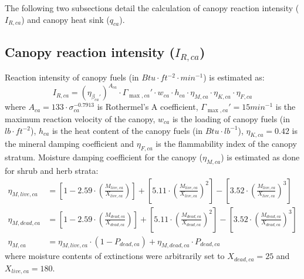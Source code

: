 \documentclass[]{book}
\begin{document}
The following two subsections detail the calculation of canopy reaction intensity (\(I_{R, ca}\)) and canopy heat sink (\(q_{ca}\)).

\hypertarget{canopy-reaction-intensity-i_r-ca}{%
\subsection{\texorpdfstring{Canopy reaction intensity (\(I_{R, ca}\))}{Canopy reaction intensity (I\_\{R, ca\})}}\label{canopy-reaction-intensity-i_r-ca}}

Reaction intensity of canopy fuels (in \(Btu \cdot ft^{-2} \cdot min^{-1}\)) is estimated as:
\begin{equation}
I_{R,ca} = (\eta_{\beta_{ca}'})^{A_{ca}}\cdot \Gamma_{\max, ca}'\cdot w_{ca} \cdot h_{ca} \cdot \eta_{M,ca}\cdot \eta_{K,ca}\cdot \eta_{F,ca}
\end{equation}
where \(A_{ca} = 133\cdot \sigma_{ca}^{-0.7913}\) is Rothermel's A coefficient, \(\Gamma_{\max, ca}' = 15 min^{-1}\) is the maximum reaction velocity of the canopy, \(w_{ca}\) is the loading of canopy fuels (in \(lb \cdot ft^{-2}\)), \(h_{ca}\) is the heat content of the canopy fuels (in \(Btu \cdot lb^{-1}\)), \(\eta_{K,ca}=0.42\) is the mineral damping coefficient and \(\eta_{F,ca}\) is the flammability index of the canopy stratum. Moisture damping coefficient for the canopy (\(\eta_{M,ca}\)) is estimated as done for shrub and herb strata:
\begin{eqnarray}
\eta_{M, live, ca} &= \left[1-2.59\cdot \left(\frac{M_{live, ca}}{X_{live, ca}}\right)\right] +\left[ 5.11\cdot \left(\frac{M_{live, ca}}{X_{live, ca}}\right)^2\right]-\left[ 3.52\cdot \left(\frac{M_{live, ca}}{X_{live, ca}}\right)^3\right] \\
\eta_{M, dead, ca} &= \left[1-2.59\cdot \left(\frac{M_{dead, ca}}{X_{dead, ca}}\right)\right] +\left[ 5.11\cdot \left(\frac{M_{dead, ca}}{X_{dead, ca}}\right)^2\right]-\left[ 3.52\cdot \left(\frac{M_{dead, ca}}{X_{dead, ca}}\right)^3\right] \\
\eta_{M, ca} &= \eta_{M, live, ca} \cdot (1 - P_{dead, ca})+ \eta_{M, dead, ca} \cdot P_{dead, ca}
\end{eqnarray}
where moisture contents of extinctions were arbitrarily set to \(X_{dead, ca} = 25\) and \(X_{live, ca} = 180\).
\end{document}
